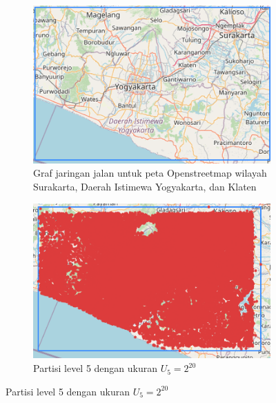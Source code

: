 \begin{figure}[h]
    \centering

    \begin{subfigure}[b]{0.45\textwidth}
        \centering
        \includegraphics[width=\linewidth]{figures/original_road_networks.png}
        \caption{Graf jaringan jalan untuk peta Openstreetmap wilayah Surakarta, Daerah Istimewa Yogyakarta, dan Klaten}
        \label{fig:a}
    \end{subfigure}
    \hfill
    \begin{subfigure}[b]{0.45\textwidth}
        \centering
        \includegraphics[width=\linewidth]{figures/partition_level_5.png}
        \caption{Partisi level 5 dengan ukuran $U_5=2^{20}$}
        \label{fig:b}
    \end{subfigure}


\end{figure}
